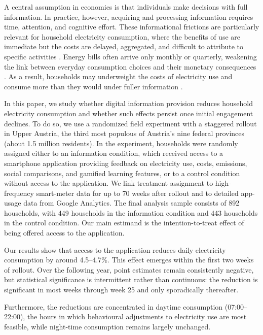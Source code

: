 A central assumption in economics is that individuals make decisions with full information. In practice, however, acquiring and processing information requires time, attention, and cognitive effort. These informational frictions are particularly relevant for household electricity consumption, where the benefits of use are immediate but the costs are delayed, aggregated, and difficult to attribute to specific activities \citep{jessoeKnowledgeLessPower2014,tiefenbeckRealtimeFeedbackPromotes2019}. Energy bills often arrive only monthly or quarterly, weakening the link between everyday consumption choices and their monetary consequences \citep{chettySalienceTaxationTheory2009}. As a result, households may underweight the costs of electricity use and consume more than they would under fuller information \citep{alcocerSalienceBiasFramework2024}.

In this paper, we study whether digital information provision reduces household electricity consumption and whether such effects persist once initial engagement declines. To do so, we use a randomized field experiment with a staggered rollout in Upper Austria, the third most populous of Austria's nine federal provinces (about 1.5 million residents). In the experiment, households were randomly assigned either to an information condition, which received access to a smartphone application providing feedback on electricity use, costs, emissions, social comparisons, and gamified learning features, or to a control condition without access to the application. We link treatment assignment to high-frequency smart-meter data for up to 70 weeks after rollout and to detailed app-usage data from Google Analytics. The final analysis sample consists of 892 households, with 449 households in the information condition and 443 households in the control condition. Our main estimand is the intention-to-treat effect of being offered access to the application.


Our results show that access to the application reduces daily electricity consumption by around 4.5–4.7\%. This effect emerges within the first two weeks of rollout. Over the following year, point estimates remain consistently negative, but statistical significance is intermittent rather than continuous: the reduction is significant in most weeks through week 25 and only sporadically thereafter.

Furthermore, the reductions are concentrated in daytime consumption (07:00–22:00), the hours in which behavioural adjustments to electricity use are most feasible, while night-time consumption remains largely unchanged.

